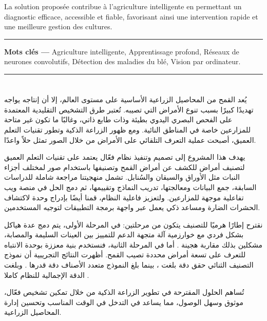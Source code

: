 La solution proposée contribue à l’agriculture intelligente en permettant un diagnostic efficace, accessible et fiable, favorisant ainsi une intervention rapide et une meilleure gestion des cultures.

\vspace{1cm}

\noindent\rule{\linewidth}{1pt}
\noindent
\textbf{Mots clés —} Agriculture intelligente, Apprentissage profond, Réseaux de neurones convolutifs, Détection des maladies du blé, Vision par ordinateur.\\
\noindent\rule{\linewidth}{1pt}







\cleardoublepage
{}
\chapter*{\Huge\bfseries\hfill{}}
\thispagestyle{noheader}



\vspace{0.1cm}
\begin{RLtext}

يُعد القمح من المحاصيل الزراعية الأساسية على مستوى العالم، إلا أن إنتاجه يواجه تهديدًا كبيرًا بسبب تنوع الأمراض التي تصيبه. تُعتبر طرق التشخيص التقليدية المعتمدة على الفحص البصري اليدوي بطيئة وذات طابع ذاتي، وغالبًا ما تكون غير متاحة للمزارعين خاصة في المناطق النائية. ومع ظهور الزراعة الذكية وتطور تقنيات التعلم العميق، أصبحت عملية التعرف التلقائي على الأمراض من خلال الصور تمثل حلاً واعدًا.

يهدف هذا المشروع إلى تصميم وتنفيذ نظام فعّال يعتمد على تقنيات التعلم العميق لتصنيف أمراض  للكشف عن أمراض القمح وتصنيفها باستخدام صور لمختلف أجزاء النبات مثل الأوراق والسيقان والسُنابل. تشمل منهجيتنا مراجعة شاملة للدراسات السابقة، جمع البيانات ومعالجتها، تدريب النماذج وتقييمها، ثم دمج الحل في منصة ويب تفاعلية موجهة للمزارعين. ولتعزيز فاعلية النظام، قمنا أيضًا بإدراج وحدة لاكتشاف الحشرات الضارة ومساعد ذكي يعمل عبر واجهة برمجة التطبيقات  لتوجيه المستخدمين.

نقترح إطارًا هرميًا للتصنيف يتكون من مرحلتين: في المرحلة الأولى، يتم دمج عدة هياكل  بشكل فردي مع خوارزمية آلة متجهة الدعم  للتمييز بين العينات السليمة والمصابة، مشكلين بذلك مقاربة هجينة . أما في المرحلة الثانية، فنستخدم بنية  معززة بوحدة الانتباه   للتعرف على تسعة أمراض محددة تصيب القمح. أظهرت النتائج التجريبية أن نموذج التصنيف الثنائي حقق دقة بلغت ، بينما بلغ النموذج متعدد الأصناف دقة قدرها . وبلغت الدقة الإجمالية للنظام كاملا  .

تُساهم الحلول المقترحة في تطوير الزراعة الذكية من خلال تمكين تشخيص فعّال، موثوق وسهل الوصول، مما يساعد في التدخل في الوقت المناسب وتحسين إدارة المحاصيل الزراعية.

\end{RLtext}


